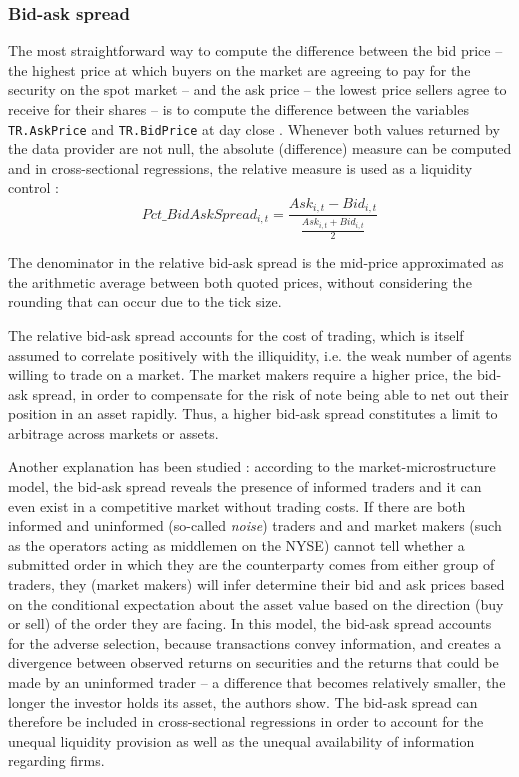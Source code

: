 \subsubsection{Bid-ask spread}
The most straightforward way to compute the difference between the bid price -- the highest price at which buyers on the market are agreeing to pay for the security on the spot market -- and the ask price -- the lowest price sellers agree to receive for their shares -- is to compute the difference between the variables \texttt{TR.AskPrice} and \texttt{TR.BidPrice} at day close . Whenever both values returned by the data provider are not null, the absolute (difference) measure can be computed and in cross-sectional regressions, the relative measure is used as a liquidity control :
\begin{equation}
  Pct\_BidAskSpread_{i, t} = \frac{Ask_{i, t} - Bid_{i, t}}{\frac{Ask_{i, t} + Bid_{i, t}}{2}}
\end{equation}

The denominator in the relative bid-ask spread is the mid-price approximated as the arithmetic average between both quoted prices, without considering the rounding that can occur due to the tick size.

The relative bid-ask spread accounts for the cost of trading, which is itself assumed to correlate positively with the illiquidity, i.e. the weak number of agents willing to trade on a market. The market makers require a higher price, the bid-ask spread, in order to compensate for the risk of note being able to net out their position in an asset rapidly. Thus, a higher bid-ask spread constitutes a limit to arbitrage across markets or assets.

Another explanation has been studied : according to the \cite{Glosten1985} market-microstructure model, the bid-ask spread reveals the presence of informed traders and it can even exist in a competitive market without trading costs. If there are both informed and uninformed (so-called \emph{noise}) traders and and market makers (such as the operators acting as middlemen on the NYSE) cannot tell whether a submitted order in which they are the counterparty comes from either group of traders, they (market makers) will infer determine their bid and ask prices based on the conditional expectation about the asset value based on the direction (buy or sell) of the order they are facing. In this model, the bid-ask spread accounts for the adverse selection, because transactions convey information, and creates a divergence between observed returns on securities and the returns that could be made by an uninformed trader -- a difference that becomes relatively smaller, the longer the investor holds its asset, the authors show. The bid-ask spread can therefore be included in cross-sectional regressions in order to account for the unequal liquidity provision as well as the unequal availability of information regarding firms.
